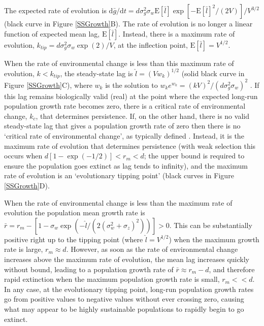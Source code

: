 \documentclass[12pt,letterpaper]{article} %
\begin{document}
The expected rate of evolution is $\mathrm{d}\bar{g}/\mathrm{d}t  = d\sigma_g^2 \sigma_w \mathrm{E}[\bar{l}] \exp\left[ -\mathrm{E}[\bar{l}]^2 / (2V) \right] / V^{3/2}$ (black curve in Figure \ref{SSGrowth}B).
The rate of evolution is no longer a linear function of expected mean lag, $\mathrm{E}[\bar{l}]$.
Instead, there is a maximum rate of evolution, $k_{tip} = d \sigma_g^2 \sigma_w \exp(2)/V$, at the inflection point, $\mathrm{E}[\bar{l}] = V^{1/2}$.

When the rate of environmental change is less than this maximum rate of evolution, $k<k_{tip}$, the steady-state lag is $\hat{l} = (V w_k)^{1/2}$ (solid black curve in Figure \ref{SSGrowth}C), where $w_k$ is the solution to $w_k e^{w_k} = (k V)^2 / (d\sigma_g^2\sigma_w)^2$ \citep[i.e., $w_k(x)$ is the Lambert W function, and here $x=(k V)^2 / (d\sigma_g^2\sigma_w)^2$;][]{Lehtonen2016}.
If this lag remains biologically valid (real) at the point where the expected long-run population growth rate becomes zero, there is a critical rate of environmental change, $k_c$, that determines persistence. 
If, on the other hand, there is no valid steady-state lag that gives a population growth rate of zero then there is no `critical rate of environmental change', as typically defined \citep{Lynch1993}.
Instead, it is the maximum rate of evolution that determines persistence (with weak selection this occurs when $d[1-\exp(-1/2)]<r_m<d$; the upper bound is required to ensure the population goes extinct as lag tends to infinity), and the maximum rate of evolution is an `evolutionary tipping point' (black curves in Figure \ref{SSGrowth}D).

When the rate of environmental change is less than the maximum rate of evolution the population mean growth rate is $\bar{r} = r_m - \left[ 1 - \sigma_w \exp\left( - \hat{l} / (2(\sigma_w^2 + \sigma_z)^2) \right)\right] > 0$. 
This can be substantially positive right up to the tipping point (where $\hat{l} = V^{1/2}$) when the maximum growth rate is large, $r_m\approx d$. 
However, as soon as the rate of environmental change increases above the maximum rate of evolution, the mean lag increases quickly without bound, leading to a population growth rate of $\bar{r} \approx r_m - d$, and therefore rapid extinction when the maximum population growth rate is small, $r_m << d$.
In any case, at the evolutionary tipping point, long-run population growth rates go from positive values to negative values without ever crossing zero, causing what may appear to be highly sustainable populations to rapidly begin to go extinct.
\end{document}
